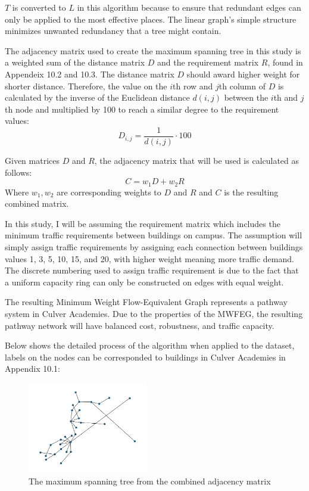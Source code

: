 \documentclass[11pt]{article}
\begin{document}
$T$ is converted to $L$ in this algorithm because to ensure that redundant edges can only be applied to the most effective places. The linear graph's simple structure minimizes unwanted redundancy that a tree might contain. \par
The adjacency matrix used to create the maximum spanning tree in this study is a weighted sum of the distance matrix $D$ and the requirement matrix $R$, found in Appendeix 10.2 and 10.3. The distance matrix $D$ should award higher weight for shorter distance. Therefore, the value on the $i$th row and $j$th column of $D$ is calculated by the inverse of the Euclidean distance $d\left(i,j\right)$ between the $i$th and $j$th node and multiplied by 100 to reach a similar degree to the requirement values: 
\[ D_{i,j}=\frac{1}{d\left(i,j\right)}\cdot100 \] \par
Given matrices $D$ and $R$, the adjacency matrix that will be used is calculated as follows: \[ C=w_1D+w_2R \] 
Where $w_1,w_2$ are corresponding weights to $D$ and $R$ and $C$ is the resulting combined matrix.  \par
In this study, I will be assuming the requirement matrix which includes the minimum traffic requirements between buildings on campus. The assumption will simply assign traffic requirements by assigning each connection between buildings values 1, 3, 5, 10, 15, and 20, with higher weight meaning more traffic demand. The discrete numbering used to assign traffic requirement is due to the fact that a uniform capacity ring can only be constructed on edges with equal weight. \par
The resulting Minimum Weight Flow-Equivalent Graph represents a pathway system in Culver Academies. Due to the properties of the MWFEG, the resulting pathway network will have balanced cost, robustness, and traffic capacity. \par
Below shows the detailed process of the algorithm when applied to the dataset, labels on the nodes can be corresponded to buildings in Culver Academies in Appendix 10.1:
\begin{figure}[H]
\centering
\includegraphics[height=150px]{mst.png}
\caption{The maximum spanning tree from the combined adjacency matrix}
\end{figure}
\end{document}
